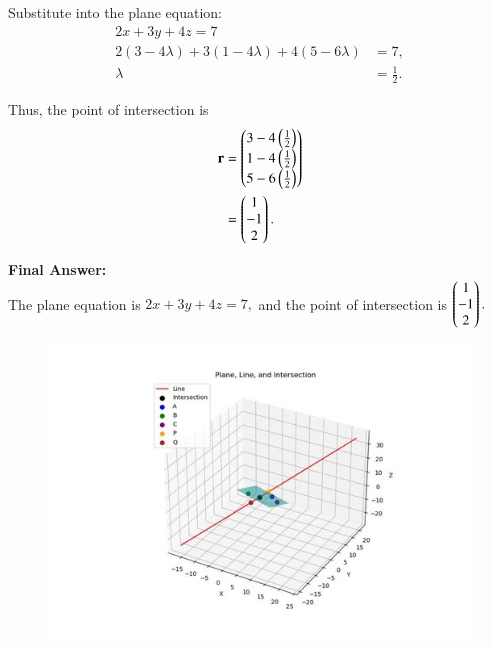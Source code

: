 \documentclass[journal]{IEEEtran}
\begin{document}
Substitute into the plane equation:
\begin{align} 
2x + 3y + 4z = 7\\
2(3 - 4\lambda) + 3(1 - 4\lambda) + 4(5 - 6\lambda) &= 7, \\
\lambda &= \tfrac{1}{2}.
\end{align}

Thus, the point of intersection is
\begin{align}
\mathbf{r} &= \begin{pmatrix}3 - 4\left(\tfrac{1}{2}\right) \\ 1 - 4\left(\tfrac{1}{2}\right) \\ 5 - 6\left(\tfrac{1}{2}\right)\end{pmatrix} \\
&= \begin{pmatrix}1 \\ -1 \\ 2\end{pmatrix}.
\end{align}

\textbf{Final Answer:} \\ 
The plane equation is
$2x + 3y + 4z = 7,$ and the point of intersection is
$\begin{pmatrix}1 \\ -1 \\ 2\end{pmatrix}.$



\begin{figure}[H]
    \centering
    \includegraphics[scale=0.7]{figs/4.4.12.jpg}
    \caption{}
    \label{fig:1}
\end{figure}
\end{document}
